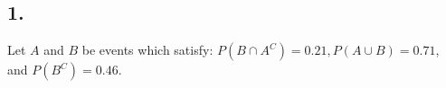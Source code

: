 

\renewcommand\assignment{Worksheet 6, due Friday 3 February, 4:15pm}

\def\firstcircle{(0:1.75cm) circle (2.5cm)}
\def\secondcircle{(180:1.75cm) circle (2.5cm)}



    \subsection*{1.}
    Let $A$ and $B$ be events which satisfy: $P (B \cap A^C) = 0.21, P (A \cup B) = 0.71$, and $P (B^C) = 0.46$.

